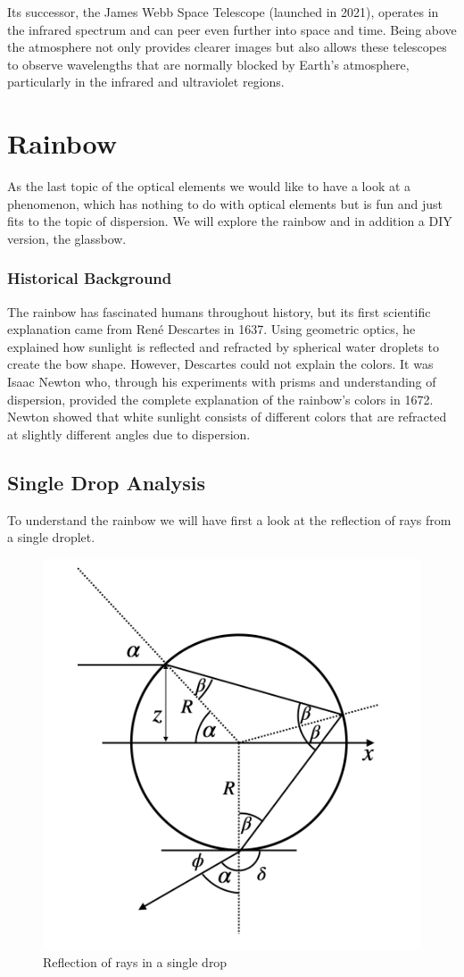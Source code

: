 \documentclass[
  a4paper,
]{book}
\begin{document}
Its successor, the James Webb Space Telescope (launched in 2021),
operates in the infrared spectrum and can peer even further into space
and time. Being above the atmosphere not only provides clearer images
but also allows these telescopes to observe wavelengths that are
normally blocked by Earth's atmosphere, particularly in the infrared and
ultraviolet regions.

\chapter{Rainbow}\label{rainbow}

As the last topic of the optical elements we would like to have a look
at a phenomenon, which has nothing to do with optical elements but is
fun and just fits to the topic of dispersion. We will explore the
rainbow and in addition a DIY version, the glassbow.

\subsection{Historical Background}\label{historical-background}

The rainbow has fascinated humans throughout history, but its first
scientific explanation came from René Descartes in 1637. Using geometric
optics, he explained how sunlight is reflected and refracted by
spherical water droplets to create the bow shape. However, Descartes
could not explain the colors. It was Isaac Newton who, through his
experiments with prisms and understanding of dispersion, provided the
complete explanation of the rainbow's colors in 1672. Newton showed that
white sunlight consists of different colors that are refracted at
slightly different angles due to dispersion.

\section{Single Drop Analysis}\label{single-drop-analysis}

To understand the rainbow we will have first a look at the reflection of
rays from a single droplet.

\begin{figure}[H]

{\centering \includegraphics[width=0.4\linewidth,height=\textheight,keepaspectratio]{geometrical-optics/img/rainbow.png}

}

\caption{Reflection of rays in a single drop}

\end{figure}%
\end{document}
